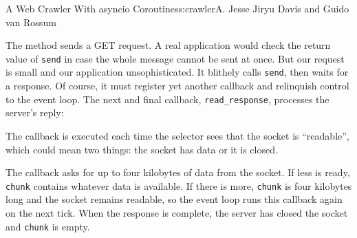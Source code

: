 \begin{aosachapter}{A Web Crawler With asyncio Coroutines}{s:crawler}{A. Jesse Jiryu Davis and Guido van Rossum}
\begin{Shaded}
\begin{Highlighting}[]
\end{Highlighting}
\end{Shaded}

The method sends a GET request. A real application would check the
return value of \texttt{send} in case the whole message cannot be sent
at once. But our request is small and our application unsophisticated.
It blithely calls \texttt{send}, then waits for a response. Of course,
it must register yet another callback and relinquish control to the
event loop. The next and final callback, \texttt{read\_response},
processes the server's reply:

\begin{Shaded}
\begin{Highlighting}[]
     
         

        \NormalTok{)  }
         
        \NormalTok{:}
            
             

             
\end{Highlighting}
\end{Shaded}

The callback is executed each time the selector sees that the socket is
``readable'', which could mean two things: the socket has data or it is
closed.

The callback asks for up to four kilobytes of data from the socket. If
less is ready, \texttt{chunk} contains whatever data is available. If
there is more, \texttt{chunk} is four kilobytes long and the socket
remains readable, so the event loop runs this callback again on the next
tick. When the response is complete, the server has closed the socket
and \texttt{chunk} is empty.


\end{aosachapter}
